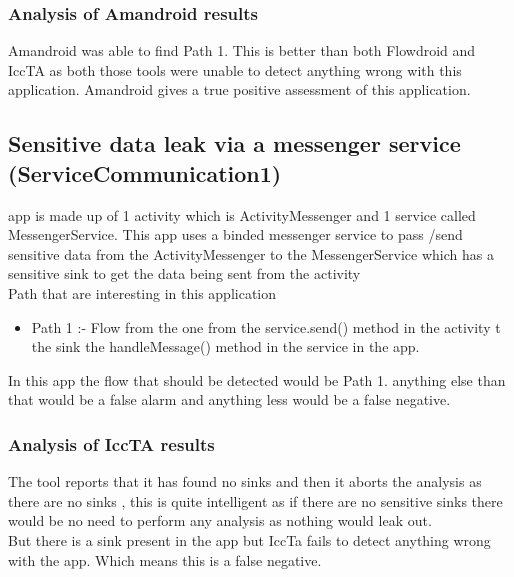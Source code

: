 \documentclass[journal]{IEEEtran}
\begin{document}
\subsubsection{Analysis of Amandroid results}
Amandroid was able to find Path 1. This is better than both Flowdroid and IccTA as both those tools were unable to detect anything wrong with this application. Amandroid gives a true positive assessment of this application.


\subsection{Sensitive data leak via a messenger service (ServiceCommunication1)}
% 
% 
% 
% 
 app is made up of 1 activity which is ActivityMessenger and 1 service called MessengerService. This app uses a binded messenger service to pass /send sensitive data from the ActivityMessenger to the MessengerService which has a sensitive sink to get the data being sent from the activity\\

Path that are interesting in this application
\begin{itemize}
	\item Path 1 :-  Flow from the one from the service.send() method in the activity t the sink the handleMessage() method in the service in the app.
\end{itemize}

In this app the flow that should be detected would be Path 1. anything else than that would be a false alarm and anything less would be a false negative. \\

  

\subsubsection{Analysis of IccTA results}
The tool reports that it has found no sinks and then it aborts the analysis as there are no sinks , this is quite intelligent as if there are no sensitive sinks there would be no need to perform any analysis as nothing would leak out. \\
But there is a sink present in the app but IccTa fails to detect anything wrong with the app. Which means this is a false negative.
\end{document}
